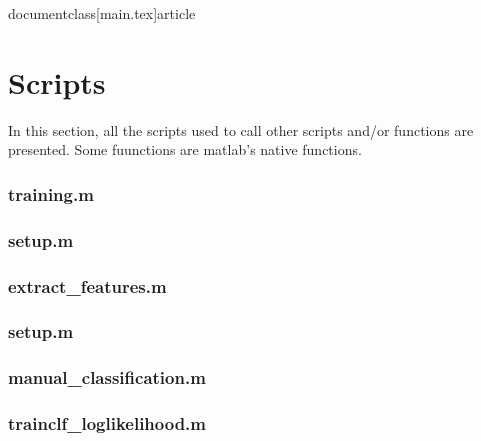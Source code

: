 documentclass[main.tex]{article}


\newpage
\appendix \label{appendix}

\section{Scripts}
In this section, all the scripts used to call other scripts and/or functions are presented. Some fuunctions are matlab's native functions.

\subsubsection*{\hypertarget{training}{training.m}}


\subsubsection*{\hypertarget{setup}{setup.m}}


\subsubsection*{\hypertarget{extractfeat}{extract\_features.m}}


\subsubsection*{\hypertarget{setup}{setup.m}}


\subsubsection*{\hypertarget{manclf}{manual\_classification.m}}


\subsubsection*{\hypertarget{trainclf}{trainclf\_loglikelihood.m}}


